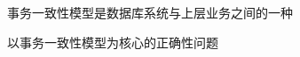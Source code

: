 






\begin{frame}{}
  \begin{center}
    事务一致性模型是数据库系统与上层业务之间的一种

    \vspace{0.30cm}
  \end{center}
\end{frame}

\begin{frame}{}
  \begin{center}
    以事务一致性模型为核心的正确性问题

    \vspace{0.50cm}
  \end{center}
\end{frame}

\begin{frame}{}
\end{frame}
